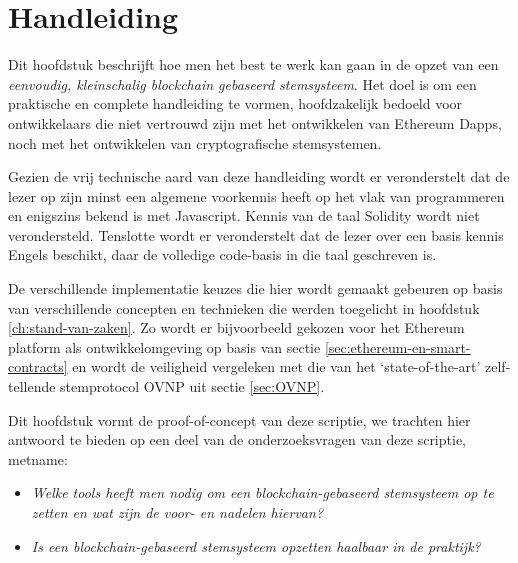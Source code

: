 

\chapter{Handleiding}
\label{ch:handleiding}

Dit hoofdstuk beschrijft hoe men het best te werk kan gaan in de opzet van een \textit{eenvoudig, kleinschalig blockchain gebaseerd stemsysteem}. Het doel is om een praktische en complete handleiding te vormen, hoofdzakelijk bedoeld voor ontwikkelaars die niet vertrouwd zijn met het ontwikkelen van Ethereum Dapps, noch met het ontwikkelen van cryptografische stemsystemen. 

Gezien de vrij technische aard van deze handleiding wordt er veronderstelt dat de lezer op zijn minst een algemene voorkennis heeft op het vlak van programmeren  en enigszins bekend is met Javascript. Kennis van de taal Solidity wordt niet verondersteld. Tenslotte wordt er veronderstelt dat de lezer over een basis kennis Engels beschikt, daar de volledige code-basis in die taal geschreven is. 

De  verschillende implementatie keuzes die hier wordt gemaakt gebeuren op basis van verschillende concepten en technieken die werden toegelicht in hoofdstuk \ref{ch:stand-van-zaken}. Zo wordt er bijvoorbeeld gekozen voor het Ethereum platform als ontwikkelomgeving op basis van sectie \ref{sec:ethereum-en-smart-contracts} en wordt de veiligheid vergeleken met die van het `state-of-the-art' zelf-tellende stemprotocol OVNP \autocite{McCorry2017} uit sectie \ref{sec:OVNP}.

Dit hoofdstuk vormt de proof-of-concept van deze scriptie, we trachten hier antwoord te bieden op een deel van de onderzoeksvragen van deze scriptie, metname: 
\begin{itemize}
	\item \textit{Welke tools heeft men nodig om een blockchain-gebaseerd stemsysteem op te zetten en wat zijn de voor- en nadelen hiervan?}
	\item \textit{Is een blockchain-gebaseerd stemsysteem opzetten haalbaar in de praktijk?} 
\end{itemize}

